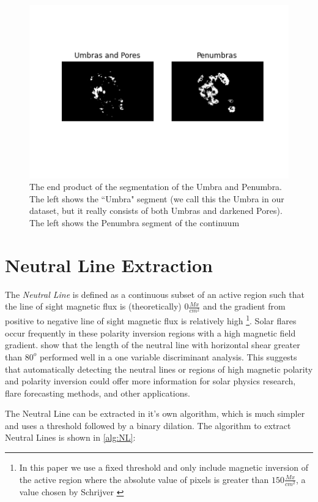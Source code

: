 \begin{figure}[h]
    \centering
    \includegraphics[width=0.7\linewidth]{ThesisFilePkg/figures/data/umbra_penumbra.png}
    \caption{The end product of the segmentation of the Umbra and Penumbra. The left shows the ``Umbra" segment (we call this the Umbra in our dataset, but it really consists of both Umbras and darkened Pores). The left shows the Penumbra segment of the continuum}
    \label{fig:UmbraPenumbrafinal}
\end{figure}

\section{Neutral Line Extraction}

The \textit{Neutral Line} is defined as a continuous subset of an active region such that the line of sight magnetic flux is (theoretically) $0\frac{Mx}{cm^2}$ and the gradient from positive to negative line of sight magnetic flux is relatively high \footnote{In this paper we use a fixed threshold and only include magnetic inversion of the active region where the absolute value of pixels is greater than $150 \frac{Mx}{cm^2}$, a value chosen by Schrijver \cite{schrijver}}. Solar flares occur frequently in these polarity inversion regions with a high magnetic field gradient. \cite{Properties2} show that the length of the neutral line with horizontal shear greater than $80^o$ performed well in a one variable discriminant analysis. This suggests that automatically detecting the neutral lines or regions of high magnetic polarity and polarity inversion could offer more information for solar physics research, flare forecasting methods, and other applications.

The Neutral Line can be extracted in it's own algorithm, which is much simpler and uses a threshold followed by a binary dilation. The algorithm to extract Neutral Lines is shown in \ref{alg:NL}:

